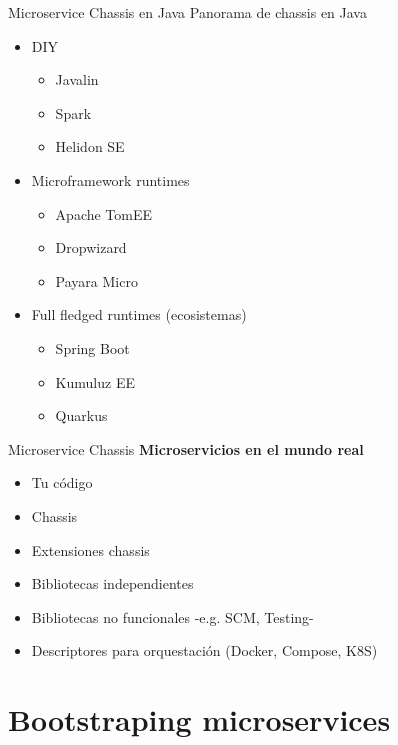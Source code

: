 \documentclass[aspectratio=169]{beamer}
\begin{document}
\begin{frame}{Microservice Chassis en Java}
Panorama de chassis en Java
\begin{itemize}
\item DIY
\begin{itemize}
\item Javalin
\item Spark
\item Helidon SE
\end{itemize}
\item Microframework runtimes
\begin{itemize}
\item Apache TomEE
\item Dropwizard
\item Payara Micro
\end{itemize}
\item Full fledged runtimes (ecosistemas)
\begin{itemize}
\item Spring Boot
\item Kumuluz EE
\item Quarkus
\end{itemize}
\end{itemize}


\end{frame}

\begin{frame}{Microservice Chassis}
\textbf{Microservicios en el mundo real}
\begin{itemize}
\item Tu código
\item Chassis
\item Extensiones chassis
\item Bibliotecas independientes
\item Bibliotecas no funcionales -e.g. SCM, Testing-
\item Descriptores para orquestación (Docker, Compose, K8S)
\end{itemize}

\end{frame}


{
    \section{Bootstraping microservices}
}
\end{document}
